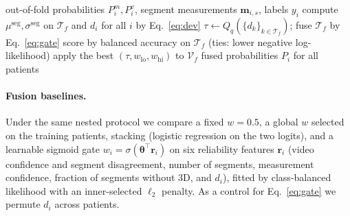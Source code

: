 \begin{algorithm}[t]
\caption{Evidence-strength gate, nested in $F$ patient folds}
\label{alg:gate}
\begin{algorithmic}[1]
\Require out-of-fold probabilities $P^{m}_i,P^{v}_i$, segment measurements $\mathbf{m}_{i,s}$, labels $y_i$
  \State compute $\mu^{\mathrm{seg}},\sigma^{\mathrm{seg}}$ on $\mathcal{T}_f$ and $d_i$ for all $i$ by Eq.~\eqref{eq:dev}
     \State $\tau\gets Q_q(\{d_k\}_{k\in\mathcal{T}_f})$; fuse $\mathcal{T}_f$ by Eq.~\eqref{eq:gate}
     \State score by balanced accuracy on $\mathcal{T}_f$ (ties: lower negative log-likelihood)
  \EndFor
  \State apply the best $(\tau,w_{\mathrm{lo}},w_{\mathrm{hi}})$ to $\mathcal{V}_f$
\EndFor
\State \Return fused probabilities $P_i$ for all patients
\end{algorithmic}
\end{algorithm}

\paragraph{Fusion baselines.} Under the same nested protocol we compare a fixed $w{=}0.5$, a
global $w$ selected on the training patients, stacking (logistic regression on the two
logits), and a learnable sigmoid gate $w_i=\sigma(\boldsymbol\theta^{\top}\mathbf{r}_i)$ on six
reliability features $\mathbf{r}_i$ (video confidence and segment disagreement, number of
segments, measurement confidence, fraction of segments without 3D, and $d_i$), fitted by
class-balanced likelihood with an inner-selected $\ell_2$ penalty. As a control for
Eq.~\eqref{eq:gate} we permute $d_i$ across patients.
